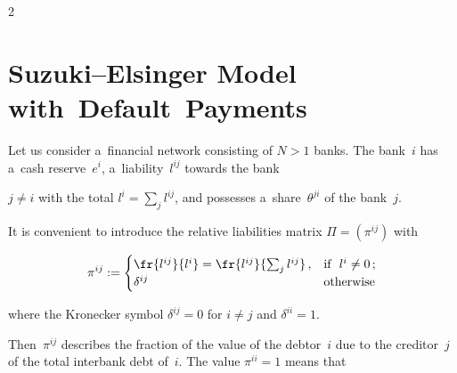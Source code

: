 \begin{multicols}{2}



\vspace*{-2pt}



\section{Suzuki--Elsinger Model with~Default~Payments}



\vspace*{-4pt}





\noindent

Let us consider a~financial network consisting of $N>1$ banks. The bank~$i$ has a~cash reserve~$e^i$, a~liability~$l^{ij}$ towards the bank 

$j\neq i$ with the total  $l^i=\sum\nolimits_j l^{ij}$, and possesses a~share~$\theta ^{ji}$ of the bank~$j$.  

It is convenient to introduce the   relative liabilities matrix $\Pi=(\pi^{ij})$ with 



\vspace*{2pt}



\noindent

\begin{equation*}


\pi^{ij}:=\begin{cases}

\fr {l^{ij}}{l^i}=\fr{l^{ij}}{\sum\nolimits_j l^{ij}}\,, & \mbox{if \ }l^i\neq 0\,;\\

\delta^{ij} &  \mbox{otherwise} 

\end{cases}

\end{equation*}



\vspace*{-4pt}



\noindent

where the Kronecker symbol $\delta^{ij}=0$ for $i\neq j$ and $\delta^{ii}=1$.

Then~$\pi^{ij}$  describes the fraction of the value of the debtor~$i$ due to the creditor~$j$ of the total interbank debt of~$i$.  The value $\pi^{ii}=1$ means that 


\end{multicols}
